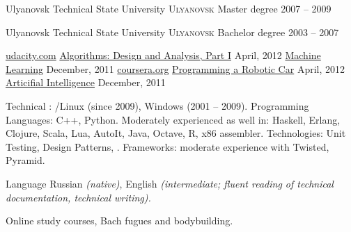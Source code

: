\documentclass[unicode, 10pt, a4paper, oneside, fleqn]{article}
\begin{document}
\spacedhrule{0.5em}{-0.4em}

\headedsection
  {Ulyanovsk Technical State University}
  {\textsc{Ulyanovsk}} {
  \headedsubsection
    {Master degree}
    {2007 -- 2009} {
    }
  }

\headedsection
  {Ulyanovsk Technical State University}
  {\textsc{Ulyanovsk}} {
  \headedsubsection
    {Bachelor degree}
    {2003 -- 2007} {
    }
  }

\spacedhrule{0.5em}{-0.4em}

\headedsection
  {\href{http://udacity.com}{udacity.com}}
  {} {
  \headedsubsection
    {\href{https://docs.google.com/document/d/1wD_QEJ7mdzxbR_PMVEbZ_tZ0SyakJ_8Y1gBAj_S5Ufg/edit}
          {Algorithms: Design and Analysis, Part I}}
    {April, 2012} {}
  \headedsubsection
    {\href{https://docs.google.com/document/d/11OT8thqIgBiwM80D_HjpiGtKTz5CnxiITPG_H6QbuUA/edit}
          {Machine Learning}}
    {December, 2011} {}
  }
\headedsection
  {\href{http://www.coursera.org}{coursera.org}}
  {} {
  \headedsubsection
    {\href{https://docs.google.com/document/d/1LpUyUwh_gGyPyKf-oxTDOy8ncQejwog1jhgMmtf59mY/edit}
          {Programming a Robotic Car}}
    {April, 2012} {}
  \headedsubsection
    {\href{https://docs.google.com/document/d/1wD_QEJ7mdzxbR_PMVEbZ_tZ0SyakJ_8Y1gBAj_S5Ufg/edit}
          {Articifial Intelligence}}
    {December, 2011} {}
  }

\spacedhrule{0.5em}{-0.4em}


\inlineheadsection  %
  {Technical}
  {: /Linux (since 2009), Windows (2001 -- 2009).
   Programming Languages: C++, Python.
   Moderately experienced as well in: Haskell, Erlang, Clojure, Scala, Lua, AutoIt,
   Java, Octave, R, x86 assembler.
   Technologies: Unit Testing, Design Patterns, .
   Frameworks: moderate experience with Twisted, Pyramid.
  }

\inlineheadsection
  {Language}
  {Russian \emph{(native)}, English \emph{(intermediate; fluent reading of
   technical documentation, technical writing).}}

\spacedhrule{1.6em}{-0.4em}


\inlineheadsection
  {}
  {Online study courses, Bach fugues and bodybuilding.}
\end{document}
